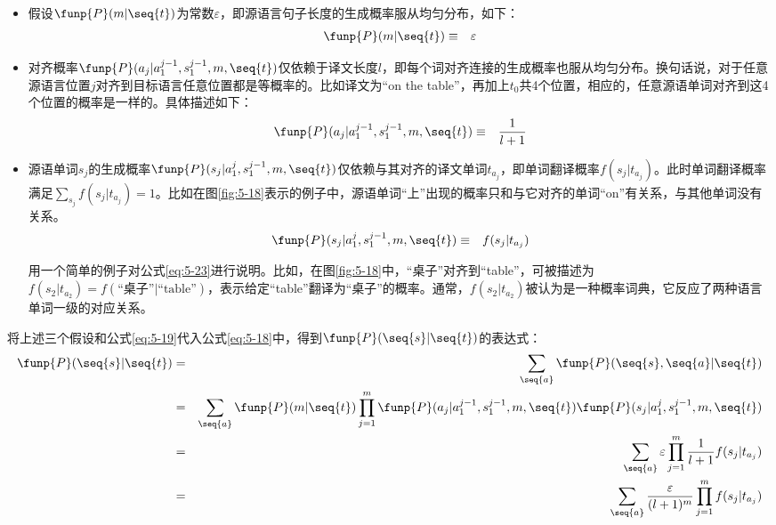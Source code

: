 \begin{itemize}
\item 假设$\funp{P}(m|\seq{t})$为常数$\varepsilon$，即源语言句子长度的生成概率服从均匀分布，如下：
\begin{eqnarray}
\funp{P}(m|\seq{t})& \equiv & \varepsilon
\label{eq:5-21}
\end{eqnarray}
\item 对齐概率$\funp{P}(a_j|a_1^{j-1},s_1^{j-1},m,\seq{t})$仅依赖于译文长度$l$，即每个词对齐连接的生成概率也服从均匀分布。换句话说，对于任意源语言位置$j$对齐到目标语言任意位置都是等概率的。比如译文为“on the table”，再加上$t_0$共4个位置，相应的，任意源语单词对齐到这4个位置的概率是一样的。具体描述如下：
\begin{eqnarray}
\funp{P}(a_j|a_1^{j-1},s_1^{j-1},m,\seq{t})& \equiv &  \frac{1}{l+1}
\label{eq:5-22}
\end{eqnarray}

\item 源语单词$s_j$的生成概率$\funp{P}(s_j|a_1^{j},s_1^{j-1},m,\seq{t})$仅依赖与其对齐的译文单词$t_{a_j}$，即单词翻译概率$f(s_j|t_{a_j})$。此时单词翻译概率满足$\sum_{s_j}{f(s_j|t_{a_j})}=1$。比如在图\ref{fig:5-18}表示的例子中，源语单词“上”出现的概率只和与它对齐的单词“on”有关系，与其他单词没有关系。
\begin{eqnarray}
\funp{P}(s_j|a_1^{j},s_1^{j-1},m,\seq{t})& \equiv &  f(s_j|t_{a_j})
\label{eq:5-23}
\end{eqnarray}

用一个简单的例子对公式\eqref{eq:5-23}进行说明。比如，在图\ref{fig:5-18}中，“桌子”对齐到“table”，可被描述为$f(s_2 |t_{a_2})=f(\textrm{“桌子”}|\textrm{“table”})$，表示给定“table”翻译为“桌子”的概率。通常，$f(s_2 |t_{a_2})$被认为是一种概率词典，它反应了两种语言单词一级的对应关系。
\end{itemize}

\parinterval 将上述三个假设和公式\eqref{eq:5-19}代入公式\eqref{eq:5-18}中，得到$\funp{P}(\seq{s}|\seq{t})$的表达式：
\begin{eqnarray}
\funp{P}(\seq{s}|\seq{t}) & = &  \sum_{\seq{a}}{\funp{P}(\seq{s},\seq{a}|\seq{t})} \nonumber \\
                        & = &  \sum_{\seq{a}}{\funp{P}(m|\seq{t})}\prod_{j=1}^{m}{\funp{P}(a_j|a_1^{j-1},s_1^{j-1},m,\seq{t})\funp{P}(s_j |a_1^j,s_1^{j-1},m,\seq{t})} \nonumber \\
                        & = &  \sum_{\seq{a}}{\varepsilon}\prod_{j=1}^{m}{\frac{1}{l+1}f(s_j|t_{a_j})} \nonumber \\
                        & = & \sum_{\seq{a}}{\frac{\varepsilon}{(l+1)^m}}\prod_{j=1}^{m}f(s_j|t_{a_j})
\label{eq:5-24}
\end{eqnarray}

